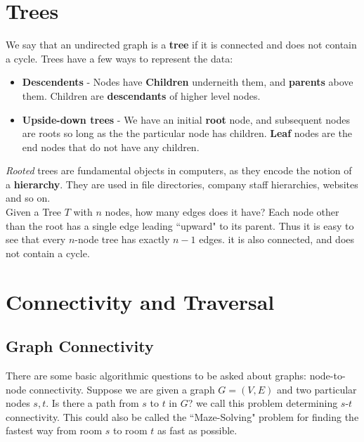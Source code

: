\documentclass{report}
\theoremstyle{definition}
\begin{document}
	\section{Trees}
		We say that an undirected graph is a \textbf{tree} if it is connected and does not contain a cycle. Trees have a
		few ways to represent the data:
		\begin{itemize}
			\item \textbf{Descendents} - Nodes have \textbf{Children} underneith them, and \textbf{parents} above them.
				Children are \textbf{descendants} of higher level nodes. 
			\item \textbf{Upside-down trees} - We have an initial \textbf{root} node, and subsequent nodes are roots 
				so long as the the particular node has children. \textbf{Leaf} nodes are the end nodes that do not
				have any children.
		\end{itemize}
		\textit{Rooted} trees are fundamental objects in computers, as they encode the notion of a \textbf{hierarchy}.
		They are used in file directories, company staff hierarchies, websites and so on.\\
	
		Given a Tree $T$ with $n$ nodes, how many edges does it have? Each node other than the root has a single
		edge leading ``upward" to its parent. Thus it is easy to see that every $n$-node tree has exactly $n-1$ edges. 
		it is also connected, and does not contain a cycle.
	\section{Connectivity and Traversal}
		\subsection{Graph Connectivity}
			There are some basic algorithmic questions to be asked about graphs: node-to-node connectivity. Suppose
			we are given a graph $G=(V, E)$ and two particular nodes $s, t$. Is there a path from $s$ to $t$ in $G$?
			we call this problem determining $s$-$t$ connectivity. This could also be called the ``Maze-Solving" problem
			for finding the fastest way from room $s$ to room $t$ as fast as possible.
\end{document}
